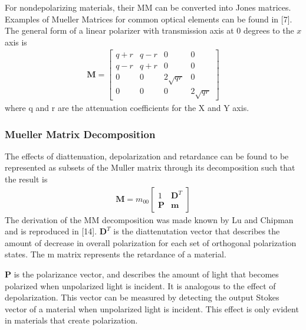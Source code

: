For nondepolarizing materials, their MM can be converted into Jones matrices.   Examples of Mueller Matrices for common optical elements can be found in [7].  The general form of a linear polarizer with transmission axis at 0 degrees to the $x$ axis is
%
\begin{align}
    \mathbf{M} =
    \begin{bmatrix}
        q + r & q - r & 0 & 0 \\
        q-r & q+r & 0  & 0 \\
        0 & 0 & 2\sqrt{qr} & 0 \\
        0 & 0 & 0 & 2\sqrt{qr}
    \end{bmatrix}
\end{align}
%
where q and r are the attenuation coefficients for the X and Y axis.

\subsubsection{Mueller Matrix Decomposition}

The effects of diattenuation, depolarization and retardance can be found to be represented as subsets of the Muller matrix through its decomposition such that the result is
\begin{align}
    \mathbf{M} = m_{00}
    \begin{bmatrix}
        1 & \mathbf{D}^T \\
        \mathbf{P} & \mathbf{m}
    \end{bmatrix}
\end{align}
The derivation of the MM decomposition was made known by Lu and Chipman and is reproduced in [14]. $\mathbf{D}^T$ is the diattenutation vector that describes the amount of decrease in overall polarization for each set of orthogonal polarization states. The m matrix represents the retardance of a material.

$\mathbf{P}$ is the polarizance vector, and describes the amount of light that becomes polarized when unpolarized light is incident.  It is analogous to the effect of depolarization.  This vector can be measured by detecting the output Stokes vector of a material when unpolarized light is incident.  This effect is only evident in materials that create polarization.
